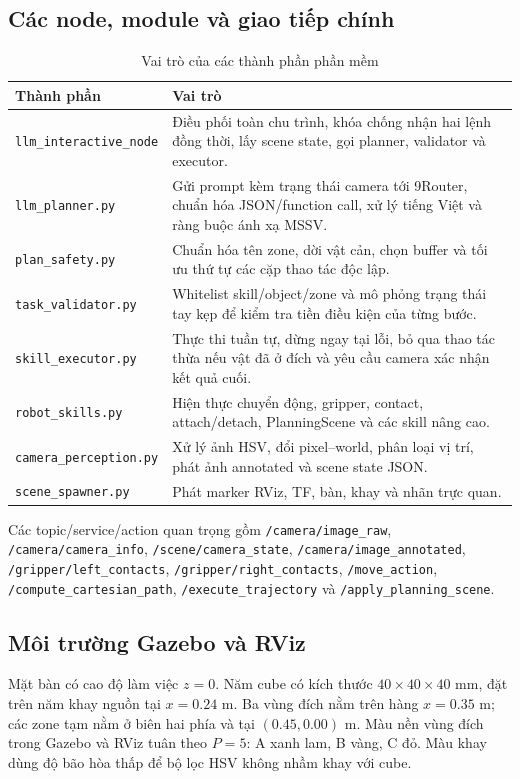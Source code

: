 \documentclass[a4paper,12pt]{article}
\newcommand{\code}[1]{\texttt{#1}}
\begin{document}
\subsection{Các node, module và giao tiếp chính}
\begin{table}[H]
\centering
\caption{Vai trò của các thành phần phần mềm}
\label{tab:modules}
\begin{tabularx}{\textwidth}{p{}X}
\toprule
\textbf{Thành phần} & \textbf{Vai trò}\\
\midrule
\code{llm\_interactive\_node} & Điều phối toàn chu trình, khóa chống nhận hai
lệnh đồng thời, lấy scene state, gọi planner, validator và executor.\\
\code{llm\_planner.py} & Gửi prompt kèm trạng thái camera tới 9Router, chuẩn
hóa JSON/function call, xử lý tiếng Việt và ràng buộc ánh xạ MSSV.\\
\code{plan\_safety.py} & Chuẩn hóa tên zone, dời vật cản, chọn buffer và tối
ưu thứ tự các cặp thao tác độc lập.\\
\code{task\_validator.py} & Whitelist skill/object/zone và mô phỏng trạng thái
tay kẹp để kiểm tra tiền điều kiện của từng bước.\\
\code{skill\_executor.py} & Thực thi tuần tự, dừng ngay tại lỗi, bỏ qua thao tác
thừa nếu vật đã ở đích và yêu cầu camera xác nhận kết quả cuối.\\
\code{robot\_skills.py} & Hiện thực chuyển động, gripper, contact, attach/detach,
PlanningScene và các skill nâng cao.\\
\code{camera\_perception.py} & Xử lý ảnh HSV, đổi pixel--world, phân loại vị trí,
phát ảnh annotated và scene state JSON.\\
\code{scene\_spawner.py} & Phát marker RViz, TF, bàn, khay và nhãn trực quan.\\
\bottomrule
\end{tabularx}
\end{table}

Các topic/service/action quan trọng gồm \code{/camera/image\_raw},
\code{/camera/camera\_info}, \code{/scene/camera\_state},
\code{/camera/image\_annotated}, \code{/gripper/left\_contacts},
\code{/gripper/right\_contacts}, \code{/move\_action},
\code{/compute\_cartesian\_path}, \code{/execute\_trajectory} và
\code{/apply\_planning\_scene}.

\subsection{Môi trường Gazebo và RViz}
Mặt bàn có cao độ làm việc $z=0$. Năm cube có kích thước
$40\times40\times40$ mm, đặt trên năm khay nguồn tại $x=0.24$ m. Ba vùng đích
nằm trên hàng $x=0.35$ m; các zone tạm nằm ở biên hai phía và tại
$(0.45,0.00)$ m. Màu nền vùng đích trong Gazebo và RViz tuân theo $P=5$: A
xanh lam, B vàng, C đỏ. Màu khay dùng độ bão hòa thấp để bộ lọc HSV không nhầm
khay với cube.
\end{document}
